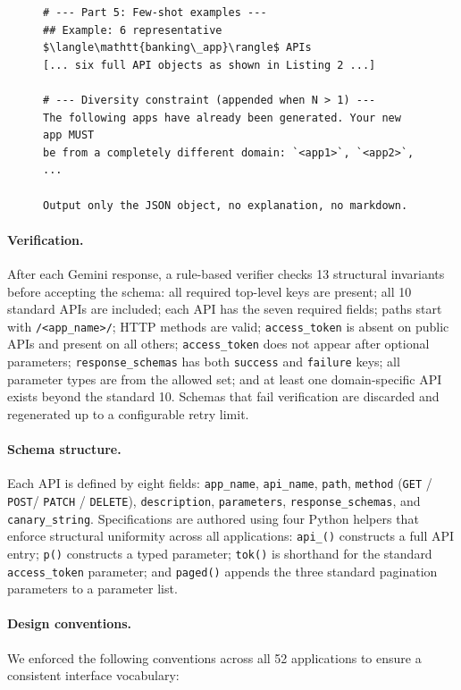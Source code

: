 \begin{figure}[t]
\begin{lstlisting}
# --- Part 5: Few-shot examples ---
## Example: 6 representative $\langle\mathtt{banking\_app}\rangle$ APIs
[... six full API objects as shown in Listing 2 ...]

# --- Diversity constraint (appended when N > 1) ---
The following apps have already been generated. Your new app MUST
be from a completely different domain: `<app1>`, `<app2>`, ...

Output only the JSON object, no explanation, no markdown.
\end{lstlisting}
\end{figure}

\paragraph{Verification.}
After each Gemini response, a rule-based verifier checks 13 structural invariants before accepting the schema: all required top-level keys are present; all 10 standard APIs are included; each API has the seven required fields; paths start with \texttt{/<app\_name>/}; HTTP methods are valid; \texttt{access\_token} is absent on public APIs and present on all others; \texttt{access\_token} does not appear after optional parameters; \texttt{response\_schemas} has both \texttt{success} and \texttt{failure} keys; all parameter types are from the allowed set; and at least one domain-specific API exists beyond the standard 10. Schemas that fail verification are discarded and regenerated up to a configurable retry limit.

\paragraph{Schema structure.}
Each API is defined by eight fields: \texttt{app\_name}, \texttt{api\_name}, \texttt{path}, \texttt{method} (\texttt{GET} / \texttt{POST}/ \texttt{PATCH} / \texttt{DELETE}), \texttt{description}, \texttt{parameters}, \texttt{response\_schemas}, and \texttt{canary\_string}. Specifications are authored using four Python helpers that enforce structural uniformity across all applications: \texttt{api\_()} constructs a full API entry; \texttt{p()} constructs a typed parameter; \texttt{tok()} is shorthand for the standard \texttt{access\_token} parameter; and \texttt{paged()} appends the three standard pagination parameters to a parameter list.

\paragraph{Design conventions.}
We enforced the following conventions across all 52 applications to ensure a consistent interface vocabulary:

